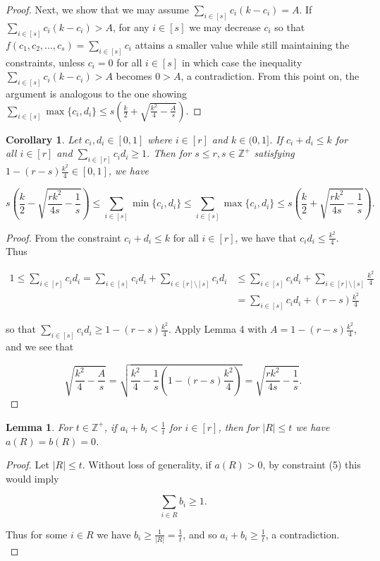 \documentclass{article}
\newtheorem{lemma}{Lemma}
\newtheorem{corollary}{Corollary}
\begin{document}
\begin{proof}
Next, we show that we may assume $\sum_{i \in [s]} c_i(k-c_i) = A$. If $\sum_{i \in [s]} c_i(k-c_i) > A$, for any $i \in [s]$ we may decrease $c_i$ so that $f(c_1,c_2,\ldots,c_s) = \sum_{i \in [s]} c_i$ attains a smaller value while still maintaining the constraints, unless $c_i = 0$ for all $i \in [s]$ in which case the inequality $\sum_{i \in [s]} c_i(k-c_i) > A$ becomes $0 > A$, a contradiction. From this point on, the argument is analogous to the one showing $\sum_{i \in [s]} \max\{c_i,d_i\} \leq s(\frac{k}{2} + \sqrt{\frac{k^2}{4}-\frac{A}{s}})$.
\end{proof}

\begin{corollary}
Let $c_i,d_i \in [0,1]$ where $i \in [r]$ and $k \in (0,1]$. If $c_i+d_i \leq k$ for all $i \in [r]$ and $\sum_{i \in [r]} c_id_i \geq 1$. Then for $s \leq r, s \in \mathbb{Z}^{+}$ satisfying $ 1 - (r-s)\frac{k^2}{4} \in [0,1]$, we have

$$s(\frac{k}{2} - \sqrt{\frac{rk^2}{4s}-\frac{1}{s}}) \leq \sum_{i \in [s]} \min\{c_i,d_i\} \leq \sum_{i \in [s]} \max\{c_i,d_i\} \leq s(\frac{k}{2} + \sqrt{\frac{rk^2}{4s}-\frac{1}{s}}).$$
\end{corollary}

\begin{proof}
From the constraint $c_i+d_i \leq k$ for all $i \in [r]$, we have that $c_id_i \leq \frac{k^2}{4}$. Thus 

\begin{align*}
1 \leq \sum_{i \in [r]} c_id_i = \sum_{i \in [s]} c_id_i + \sum_{i \in [r] \setminus [s]} c_id_i &\leq \sum_{i \in [s]} c_id_i + \sum_{i \in [r] \setminus [s]} \frac{k^2}{4} \\
&= \sum_{i \in [s]} c_id_i +(r-s)\frac{k^2}{4}
\end{align*}


\noindent
so that $\sum_{i \in [s]} c_id_i \geq 1 - (r-s)\frac{k^2}{4}$. Apply Lemma 4 with $A = 1 - (r-s)\frac{k^2}{4}$, and we see that

$$\sqrt{\frac{k^2}{4}-\frac{A}{s}} = \sqrt{\frac{k^2}{4}-\frac{1}{s}(1 - (r-s)\frac{k^2}{4})} = \sqrt{\frac{rk^2}{4s}-\frac{1}{s}}.$$
\end{proof}

\begin{lemma}
For $t \in \mathbb{Z}^{+}$, if $a_i + b_i < \frac{1}{t}$ for $i \in [r]$, then for $|R| \leq t$ we have $a(R) = b(R) = 0$. 
\end{lemma}

\begin{proof}
Let $|R| \leq t$. Without loss of generality, if $a(R) > 0$, by constraint (5) this would imply

$$\sum_{i \in R} b_i \geq 1.$$

\noindent
Thus for some $i \in R$ we have $b_i \geq \frac{1}{|R|} = \frac{1}{t}$, and so $a_i + b_i \geq \frac{1}{t}$, a contradiction. \\
\end{proof}
\end{document}
